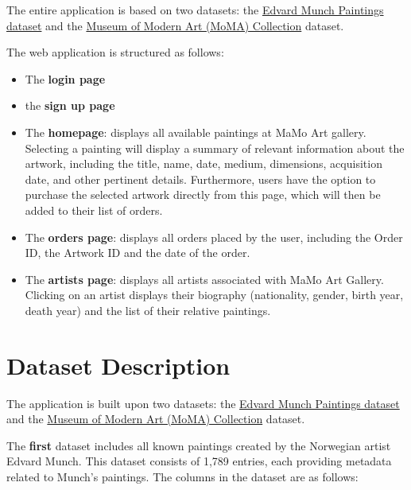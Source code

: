 \documentclass[a4paper,12pt]{article}
\begin{document}
The entire application is based on two datasets: the \href{https://www.kaggle.com/datasets/isaienkov/edvard-munch-paintings}{Edvard Munch Paintings dataset} and the \href{https://www.kaggle.com/datasets/momanyc/museum-collection?select=artworks.csv}{Museum of Modern Art (MoMA) Collection} dataset.

The web application is structured as follows:

\begin{itemize}
    \item The \textbf{login page}
    \item the \textbf{sign up page}

    \item The \textbf{homepage}: displays all available paintings at MaMo Art gallery. Selecting a painting will display a summary of relevant information about the artwork, including the title, name, date, medium, dimensions, acquisition date, and other pertinent details. Furthermore, users have the option to purchase the selected artwork directly from this page, which will then be added to their list of orders.

    \item The \textbf{orders page}: displays all orders placed by the user, including the Order ID, the Artwork ID and the date of the order.

    \item The \textbf{artists page}:  displays all artists associated with MaMo Art Gallery. Clicking on an artist displays their biography (nationality, gender, birth year, death year) and the list of their relative paintings.

\end{itemize}

\newpage
\section{Dataset Description}
\justify

The application is built upon two datasets: the \href{https://www.kaggle.com/datasets/isaienkov/edvard-munch-paintings}{Edvard Munch Paintings dataset} and the \href{https://www.kaggle.com/datasets/momanyc/museum-collection?select=artworks.csv}{Museum of Modern Art (MoMA) Collection} dataset.


The \textbf{first} dataset includes all known paintings created by the Norwegian artist Edvard Munch. This dataset consists of 1,789 entries, each providing metadata related to Munch's paintings. The columns in the dataset are as follows:
\end{document}
